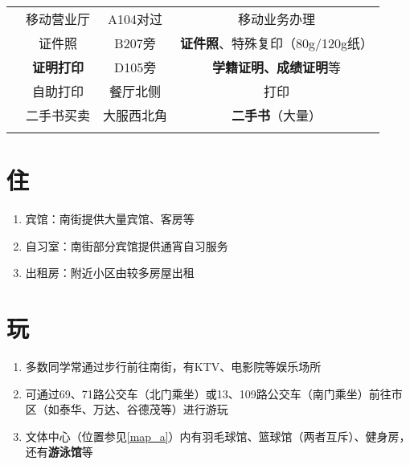 \begin{table}[!ht]
\begin{tabular}{|c|c|c|c|}
        \cline{2-4}
                              & 移动营业厅              & A104对过 & 移动业务办理                       \\
        \Xhline{1.2pt}
        \multirow{4}{*}{其他}   & 证件照                & B207旁  & \textbf{证件照}、特殊复印（80g/120g纸） \\
        \cline{2-4}
                              & \textbf{证明打印}      & D105旁  & \textbf{学籍证明、成绩证明}等          \\
        \cline{2-4}
                              & 自助打印               & 餐厅北侧   & 打印                           \\
        \cline{2-4}
                              & 二手书买卖              & 大服西北角 & \textbf{二手书}（大量）             \\
        \Xhline{1.2pt}
    \end{tabular}
\end{table}

\section[住]{住}
\begin{enumerate}
    \item 宾馆：南街提供大量宾馆、客房等
    \item 自习室：南街部分宾馆提供通宵自习服务
    \item 出租房：附近小区由较多房屋出租\footnotemark
\end{enumerate}

\section[玩]{玩}
\begin{enumerate}
    \item 多数同学常通过步行前往南街，有KTV、电影院等娱乐场所
    \item 可通过69、71路公交车（北门乘坐）或13、109路公交车（南门乘坐）前往市区（如泰华、万达、谷德茂等）进行游玩
    \item 文体中心（位置参见\uline{\ref{map_a}}）内有羽毛球馆、篮球馆（两者互斥）、健身房，还有\textbf{游泳馆}等\footnotemark
\end{enumerate}